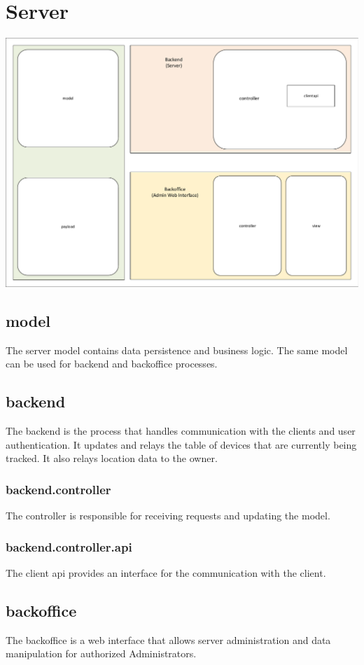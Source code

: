 \section{Server}
\includegraphics[width=\textwidth]{img/server_packages}

\subsection{model}
The server model contains data persistence and business logic. The same model can be used for backend and backoffice processes.
\subsection{backend}
The backend is the process that handles communication with the clients and user authentication. It updates and relays the table of devices that are currently being tracked. It also relays location data to the owner.
\subsubsection{backend.controller}
The controller is responsible for receiving requests and updating the model.
\subsubsection{backend.controller.api}
The client api provides an interface for the communication with the client.
\subsection{backoffice}
The backoffice is a web interface that allows server administration and data manipulation for authorized Administrators.
